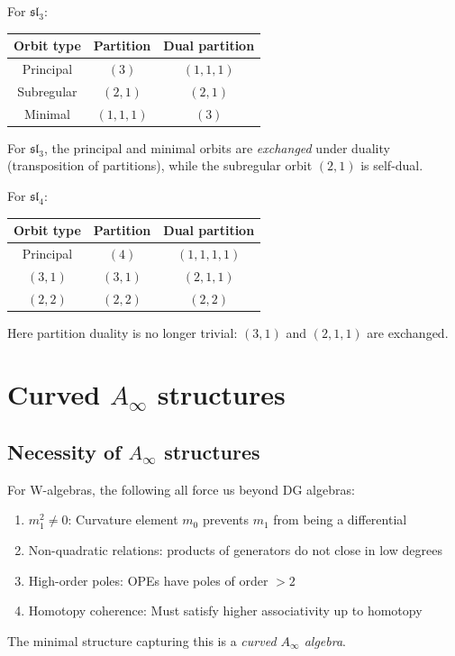 \begin{example}
For $\mathfrak{sl}_3$:
\begin{center}
\begin{tabular}{c|c|c}
Orbit type & Partition & Dual partition \\
\hline
Principal & $(3)$ & $(1,1,1)$ \\
Subregular & $(2,1)$ & $(2,1)$ \\
Minimal & $(1,1,1)$ & $(3)$
\end{tabular}
\end{center}

For $\mathfrak{sl}_3$, the principal and minimal orbits are \emph{exchanged} under duality (transposition of partitions), while the subregular orbit $(2,1)$ is self-dual.

For $\mathfrak{sl}_4$:
\begin{center}
\begin{tabular}{c|c|c}
Orbit type & Partition & Dual partition \\
\hline
Principal & $(4)$ & $(1,1,1,1)$ \\
$(3,1)$ & $(3,1)$ & $(2,1,1)$ \\
$(2,2)$ & $(2,2)$ & $(2,2)$
\end{tabular}
\end{center}

Here partition duality is no longer trivial: $(3,1)$ and $(2,1,1)$ are exchanged.
\end{example}

\section{\texorpdfstring{Curved $A_\infty$ structures}{Curved A infty structures}}

\subsection{\texorpdfstring{Necessity of $A_\infty$ structures}{Necessity of A infty structures}}

\begin{remark}
For W-algebras, the following all force us beyond DG algebras:
\begin{enumerate}
\item $m_1^2 \neq 0$: Curvature element $m_0$ prevents $m_1$ from being a differential
\item Non-quadratic relations: products of generators do not close in low degrees
\item High-order poles: OPEs have poles of order $> 2$
\item Homotopy coherence: Must satisfy higher associativity up to homotopy
\end{enumerate}

The minimal structure capturing this is a \emph{curved $A_\infty$ algebra}.
\end{remark}

